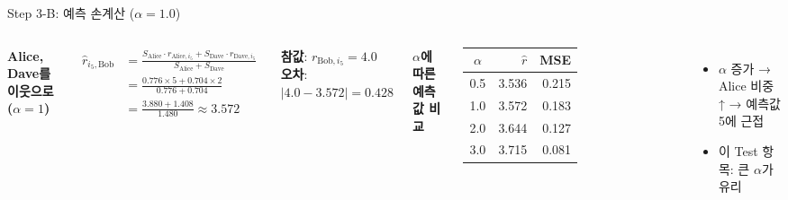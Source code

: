 \documentclass[aspectratio=169, 10pt]{beamer}
\begin{document}
\begin{frame}{Step 3-B: 예측 손계산 ($\alpha = 1.0$)}

  \begin{columns}[T]
      \textbf{Alice, Dave를 이웃으로 ($\alpha=1$)}
      \vspace{0.4em}

      \begin{align*}
        \hat{r}_{i_5,\text{Bob}}
        &= \frac{S_\text{Alice} \cdot r_{\text{Alice},i_5}
                 + S_\text{Dave} \cdot r_{\text{Dave},i_5}}
                {S_\text{Alice} + S_\text{Dave}} \\[6pt]
        &= \frac{0{.}776 \times 5 + 0{.}704 \times 2}
                {0{.}776 + 0{.}704} \\[6pt]
        &= \frac{3{.}880 + 1{.}408}{1{.}480}
         \approx \mathbf{3.572}
      \end{align*}

      \vspace{0.3em}
      \textbf{참값}: $r_{\text{Bob},i_5} = 4.0$\\[4pt]
      \textbf{오차}: $|4.0 - 3.572| = 0.428$

      \textbf{$\alpha$에 따른 예측값 비교}
      \vspace{0.3em}

      \renewcommand{\arraystretch}{1.3}
      \begin{tabular}{c|rr}
        \toprule
        $\alpha$ & $\hat{r}$ & MSE \\
        \midrule
        0.5 & 3.536 & 0.215 \\
        \rowcolor{hilight}
        1.0 & 3.572 & 0.183 \\
        2.0 & 3.644 & 0.127 \\
        3.0 & 3.715 & 0.081 \\
        \bottomrule
      \end{tabular}
      \vspace{0.4em}
      \begin{itemize}
        \item $\alpha$ 증가 → Alice 비중 ↑ → 예측값 5에 근접
        \item 이 Test 항목: 큰 $\alpha$가 유리
      \end{itemize}
  \end{columns}
\end{frame}
\end{document}
